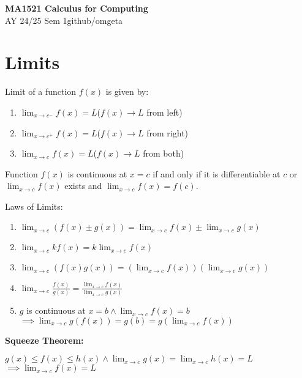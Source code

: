 \documentclass[12pt, a4paper]{article}
\newcommand{\mytitle}{MA1521 Calculus for Computing}
\newcommand{\myauthor}{github/omgeta}
\newcommand{\mydate}{AY 24/25 Sem 1}
\begin{document}
\raggedright
\footnotesize
\begin{multicols*}{3}
\setlength{\premulticols}{1pt}
\setlength{\postmulticols}{1pt}
\setlength{\multicolsep}{1pt}
\setlength{\columnsep}{2pt}

{\normalsize{\textbf{\mytitle}}} \\
{\footnotesize{\mydate\hspace{2pt}\textemdash\hspace{2pt}\myauthor}}
\section{Limits}
Limit of a function $f(x)$ is given by:
\begin{enumerate}[\roman*.]
  \item $\displaystyle \lim_{x\rightarrow c^-} f(x) = L$\hfill($f(x) \rightarrow L$ from left)
  \item $\displaystyle \lim_{x\rightarrow c^+} f(x) = L$\hfill($f(x) \rightarrow L$ from right)
  \item $\displaystyle \lim_{x\rightarrow c} f(x) = L$\hfill($f(x) \rightarrow L$ from both)
\end{enumerate}

Function $f(x)$ is continuous at $x=c$ if and only if it is differentiable at $c$ or $\displaystyle \lim_{x\rightarrow c}f(x)$ exists and $\displaystyle \lim_{x\rightarrow c}f(x) = f(c)$.

Laws of Limits:
\begin{enumerate}[\roman*.]
  \item $\displaystyle \lim_{x\rightarrow c}(f(x) \pm g(x)) = \lim_{x\rightarrow c}f(x) \pm \lim_{x\rightarrow c}g(x)$
  \item $\displaystyle \lim_{x\rightarrow c}kf(x) = k\lim_{x\rightarrow c}f(x)$
  \item $\displaystyle \lim_{x\rightarrow c}(f(x)g(x)) = (\lim_{x\rightarrow c}f(x))(\lim_{x\rightarrow c}g(x))$
  \item $\displaystyle \lim_{x\rightarrow c} \frac{f(x)}{g(x)} = \frac{\lim_{x\rightarrow c}f(x)}{\lim_{x\rightarrow c}g(x)}$
  \item $g$ is continuous at $x=b \land \displaystyle\lim_{x\rightarrow c}f(x)=b $\\$\implies \lim_{x\rightarrow c}g(f(x)) = g(b) = g(\lim_{x\rightarrow c}f(x))$
\end{enumerate}
\textbf{Squeeze Theorem:}\\
{\centering
  $g(x) \leq f(x) \leq h(x) \land \displaystyle \lim_{x\rightarrow c}g(x) = \lim_{x\rightarrow c}h(x) = L $\\$\implies \displaystyle \lim_{x\rightarrow c}f(x) = L$
\par}


\end{multicols*}
\end{document}
